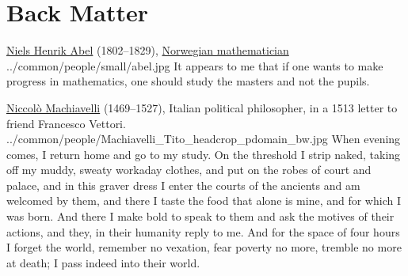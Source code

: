 ﻿%


\backmatter
\section*{Back Matter}

\qboxnps
  {
    \href{http://en.wikipedia.org/wiki/Niels_Henrik_Abel}{Niels Henrik Abel}
   (1802--1829),
   \href{http://www-history.mcs.st-andrews.ac.uk/BirthplaceMaps/Places/Russia.html}{Norwegian mathematician}
    \footnotemark
  }
  {../common/people/small/abel.jpg}
  {It appears to me that if one wants to make progress in mathematics,
    one should study the masters and not the pupils.}

\qboxnpq
  {
    \href{http://en.wikipedia.org/wiki/Niccol\%C3\%B2_Machiavelli}{Niccol\`o Machiavelli}
    (1469--1527), Italian political philosopher,
    in a 1513 letter to friend Francesco Vettori.
    \footnotemark
  }
  {../common/people/Machiavelli_Tito_headcrop_pdomain_bw.jpg}
  {When evening comes, I return home and go to my study.
    On the threshold I strip naked, taking off my muddy, sweaty workaday clothes,
    and put on the robes of court and palace,
    and in this graver dress I enter the courts of the ancients and am welcomed by them,
    and there I taste the food that alone is mine, and for which I was born.
    And there I make bold to speak to them and ask the motives of their actions,
    and they, in their humanity reply to me.
    And for the space of four hours I forget the world, remember no vexation,
    fear poverty no more, tremble no more at death;
    I pass indeed into their world.}

